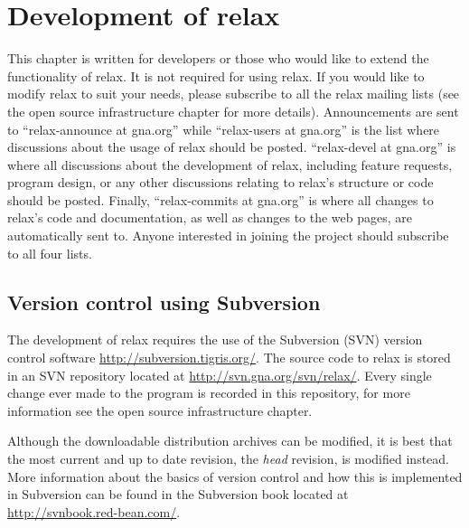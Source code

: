 
\chapter{Development of relax}

This chapter is written for developers or those who would like to extend the functionality of relax.  It is not required for using relax.  If you would like to modify relax to suit your needs, please subscribe to all the relax mailing lists (see the open source infrastructure chapter for more details).  Announcements are sent to ``relax-announce at gna.org'' while ``relax-users at gna.org'' is the list where discussions about the usage of relax should be posted.  ``relax-devel at gna.org'' is where all discussions about the development of relax, including feature requests, program design, or any other discussions relating to relax's structure or code should be posted.  Finally, ``relax-commits at gna.org'' is where all changes to relax's code and documentation, as well as changes to the web pages, are automatically sent to.  Anyone interested in joining the project should subscribe to all four lists.




\section{Version control using Subversion}\label{svn repository}

The development of relax requires the use of the Subversion (SVN) version control software \href{http://subversion.tigris.org/}{http://subversion.tigris.org/}.  The source code to relax is stored in an SVN repository located at \href{http://svn.gna.org/svn/relax/}{http://svn.gna.org/svn/relax/}.  Every single change ever made to the program is recorded in this repository, for more information see the open source infrastructure chapter.

Although the downloadable distribution archives can be modified, it is best that the most current and up to date revision, the \textit{head} revision, is modified instead.  More information about the basics of version control and how this is implemented in Subversion can be found in the Subversion book located at \href{http://svnbook.red-bean.com/}{http://svnbook.red-bean.com/}.

